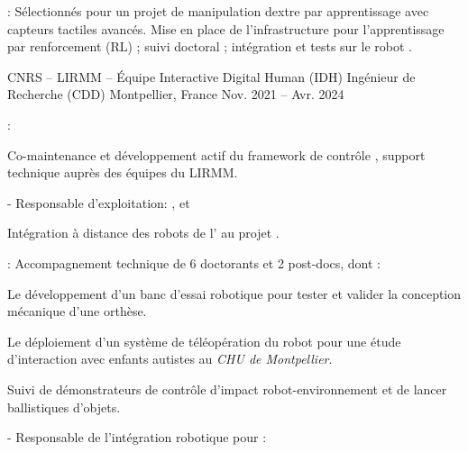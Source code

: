 \begin{cventries}
{\begin{cvitems}
\begin{subitems}
      \item {} : Sélectionnés pour un projet de manipulation dextre par apprentissage avec
        capteurs tactiles avancés. Mise en place de l'infrastructure pour
        l'apprentissage par renforcement (RL) ; suivi doctoral ; intégration et tests sur le robot .
      \end{subitems}
    \end{cvitems}
  }
  \cventry
  {CNRS -- LIRMM -- Équipe Interactive Digital Human (IDH)} %
  {Ingénieur de Recherche (CDD)} %
  {Montpellier, France} %
  {Nov. 2021 -- Avr. 2024} %
  {
    \begin{cvitems} %
    \item {} :
      \begin{subitems}
      \item Co-maintenance et développement actif du framework de contrôle , support
        technique auprès des équipes du LIRMM.
      \end{subitems}
    \item {} - Responsable d'exploitation: ,  et
      \begin{subitems}
      \item Intégration à distance des robots  de l' au projet .
      \end{subitems}
    \item {} : Accompagnement technique de 6 doctorants et 2 post-docs, dont :
      \begin{subitems}
      \item Le développement d'un banc d'essai robotique pour tester et valider la conception mécanique d'une orthèse.
      \item Le déploiement d'un système de téléopération du robot  pour une étude
        d'interaction avec enfants autistes au \emph{CHU de Montpellier}.
      \item Suivi de démonstrateurs de contrôle d'impact robot-environnement et de lancer ballistiques d'objets.
      \end{subitems}
    \item {} - Responsable de l'intégration robotique pour :

\end{cvitems}}
\end{cventries}
